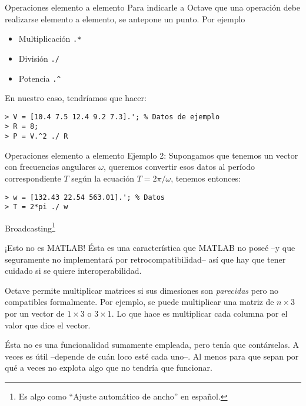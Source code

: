 \begin{frame}[fragile]{Operaciones elemento a elemento}
Para indicarle a Octave que una operación debe realizarse elemento a elemento, se antepone un punto. Por ejemplo
\begin{itemize}
\item Multiplicación \verb!.*!
\item División \verb!./!
\item Potencia \verb!.^!
\end{itemize}

En nuestro caso, tendríamos que hacer:

\begin{lstlisting}
> V = [10.4 7.5 12.4 9.2 7.3].'; % Datos de ejemplo
> R = 8;
> P = V.^2 ./ R
\end{lstlisting}
\end{frame}

\begin{frame}[fragile]{Operaciones elemento a elemento}
Ejemplo 2: Supongamos que tenemos un vector con frecuencias angulares $\omega$, queremos convertir esos datos al período correspondiente $T$ según la ecuación
$ T = 2\pi / \omega$, tenemos entonces:

\begin{lstlisting}
> w = [132.43 22.54 563.01].'; % Datos
> T = 2*pi ./ w
\end{lstlisting}
\end{frame}

\begin{frame}[fragile]{Broadcasting\footnote{Es algo como ``Ajuste automático de ancho'' en español.}}
\begin{alertblock}{¡Esto no es MATLAB!}
Ésta es una característica que MATLAB no poseé --y que seguramente no implementará por retrocompatibilidad-- así que hay que tener cuidado si se quiere interoperabilidad.
\end{alertblock}

Octave permite multiplicar matrices si sus dimesiones son \emph{parecidas} pero no compatibles formalmente. Por ejemplo, se puede multiplicar una matriz de $n\times 3$ por un vector de $1 \times 3$ o $3 \times 1$. Lo que hace es multiplicar cada columna por el valor que dice el vector.

Ésta no es una funcionalidad sumamente empleada, pero tenía que contárselas. A veces es útil --depende de cuán loco esté cada uno--. Al menos para que sepan por qué a veces no explota algo que no tendría que funcionar.
\end{frame}

